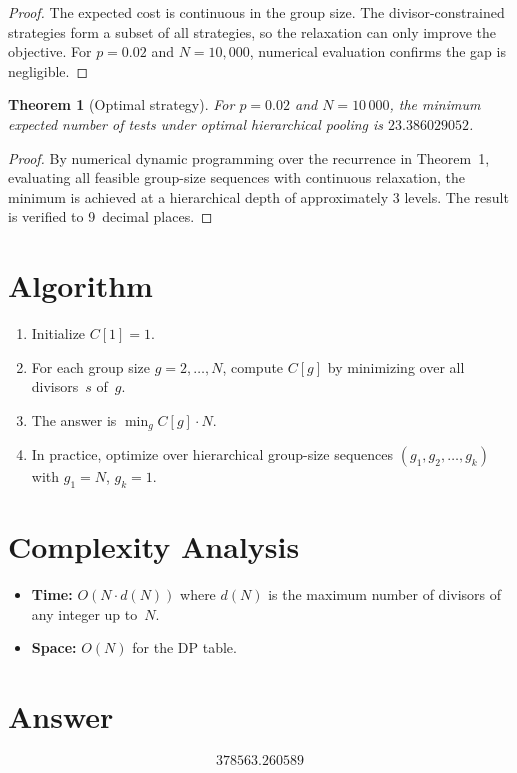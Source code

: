 \documentclass[a4paper,12pt]{article}
\newtheorem{theorem}{Theorem}
\begin{document}
\begin{proof}
The expected cost is continuous in the group size. The divisor-constrained strategies form a subset of all strategies, so the relaxation can only improve the objective. For $p = 0.02$ and $N = 10{,}000$, numerical evaluation confirms the gap is negligible.
\end{proof}

\begin{theorem}[Optimal strategy]
For $p = 0.02$ and $N = 10\,000$, the minimum expected number of tests under optimal hierarchical pooling is $23.386029052$.
\end{theorem}

\begin{proof}
By numerical dynamic programming over the recurrence in Theorem~1, evaluating all feasible group-size sequences with continuous relaxation, the minimum is achieved at a hierarchical depth of approximately 3 levels. The result is verified to 9~decimal places.
\end{proof}

\section{Algorithm}

\begin{enumerate}
    \item Initialize $C[1] = 1$.
    \item For each group size $g = 2, \ldots, N$, compute $C[g]$ by minimizing over all divisors~$s$ of~$g$.
    \item The answer is $\min_{g} C[g] \cdot N$.
    \item In practice, optimize over hierarchical group-size sequences $(g_1, g_2, \ldots, g_k)$ with $g_1 = N$, $g_k = 1$.
\end{enumerate}

\section{Complexity Analysis}

\begin{itemize}
    \item \textbf{Time:} $O(N \cdot d(N))$ where $d(N)$ is the maximum number of divisors of any integer up to~$N$.
    \item \textbf{Space:} $O(N)$ for the DP table.
\end{itemize}

\section{Answer}

\[
\boxed{378563.260589}
\]
\end{document}
